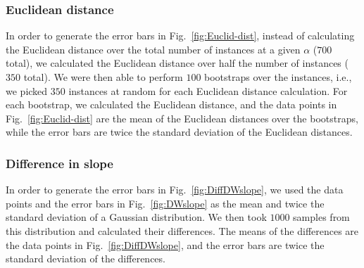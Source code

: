 \subsubsection{Euclidean distance}
In order to generate the error bars in Fig.~\ref{fig:Euclid-dist}, instead of calculating the Euclidean distance over the total number of instances at a given $\alpha$ ($700$  total), we calculated the Euclidean distance over half the number of instances ($350$  total).  We were then able to perform $100$ bootstraps over the instances, i.e., we picked $350$ instances at random for each Euclidean distance calculation.  For each bootstrap, we calculated the Euclidean distance, and the data points in Fig.~\ref{fig:Euclid-dist} are the mean of the Euclidean distances over the bootstraps, while the error bars are twice the standard deviation of the Euclidean distances.

\subsubsection{Difference in slope}
In order to generate the error bars in Fig.~\ref{fig:DiffDWslope}, we used the data points and the error bars in Fig.~\ref{fig:DWslope} as the mean and twice the standard deviation of a Gaussian distribution.  We then took $1000$ samples from this distribution and calculated their differences.  The means of the differences are the data points in Fig.~\ref{fig:DiffDWslope}, and the error bars are twice the standard deviation of the differences.


